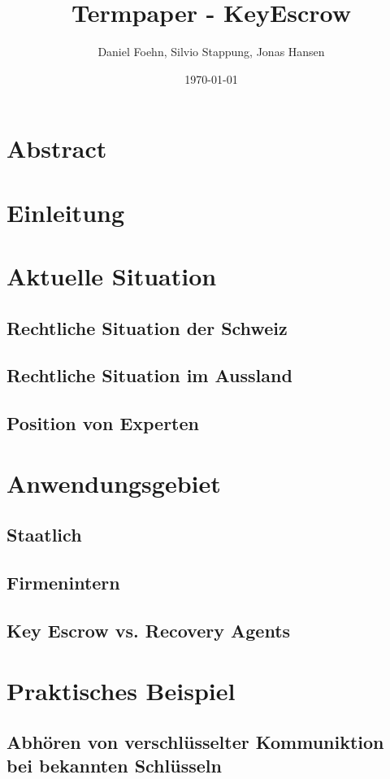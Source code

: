 \documentclass[a4paper, 10pt, fleqn]{article}
\title{Termpaper - KeyEscrow}
\author{Daniel Foehn, Silvio Stappung, Jonas Hansen}
\date{\today} %
\begin{document}
\maketitle
\tableofcontents
\listoffigures
\listoftables
\clearpage
\section{Abstract}
\clearpage
\section{Einleitung}
\clearpage
\section{Aktuelle Situation}
	\subsection{Rechtliche Situation der Schweiz}
	\subsection{Rechtliche Situation im Aussland}
	\subsection{Position von Experten}
	
\clearpage
\section{Anwendungsgebiet}
	\subsection{Staatlich}
	\subsection{Firmenintern}
	\subsection{Key Escrow vs. Recovery Agents}
\clearpage
\section{Praktisches Beispiel}
	\subsection{Abhören von verschlüsselter Kommuniktion bei bekannten Schlüsseln}
\clearpage
\end{document}

